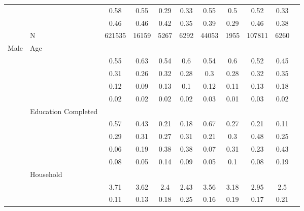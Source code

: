 \begin{table}[ht]
\begin{tabular}{l>{\raggedright\arraybackslash}p{3.2cm}|ccccccccc}
   & \multicolumn{1}{>{\raggedleft\arraybackslash}p{2.9cm}|}{\makebox[2.9cm][r]{Lives with Child }} & 0.58 & 0.55 & 0.29 & 0.33 & 0.55 & 0.5 & 0.52 & 0.33 \\ 
   & \multicolumn{1}{>{\raggedleft\arraybackslash}p{3.4cm}|}{\makebox[3.4cm][r]{Married/Cohabiting }} & 0.46 & 0.46 & 0.42 & 0.35 & 0.39 & 0.29 & 0.46 & 0.38 \\ 
   & N & 621535 & 16159 & 5267 & 6292 & 44053 & 1955 & 107811 & 6260 \\ 
  Male & Age &  &  &  &  &  &  &  &  \\ 
   & \multicolumn{1}{>{\raggedleft\arraybackslash}p{1.5cm}|}{\makebox[1.5cm][r]{60 - 69 }} & 0.55 & 0.63 & 0.54 & 0.6 & 0.54 & 0.6 & 0.52 & 0.45 \\ 
   & \multicolumn{1}{>{\raggedleft\arraybackslash}p{1.5cm}|}{\makebox[1.5cm][r]{70 - 79 }} & 0.31 & 0.26 & 0.32 & 0.28 & 0.3 & 0.28 & 0.32 & 0.35 \\ 
   & \multicolumn{1}{>{\raggedleft\arraybackslash}p{1.5cm}|}{\makebox[1.5cm][r]{80 - 89 }} & 0.12 & 0.09 & 0.13 & 0.1 & 0.12 & 0.11 & 0.13 & 0.18 \\ 
   & \multicolumn{1}{>{\raggedleft\arraybackslash}p{1.5cm}|}{\makebox[1.5cm][r]{90 plus }} & 0.02 & 0.02 & 0.02 & 0.02 & 0.03 & 0.01 & 0.03 & 0.02 \\ 
   & Education Completed &  &  &  &  &  &  &  &  \\ 
   & \multicolumn{1}{>{\raggedleft\arraybackslash}p{3.2cm}|}{\makebox[3.2cm][r]{Less than Primary }} & 0.57 & 0.43 & 0.21 & 0.18 & 0.67 & 0.27 & 0.21 & 0.11 \\ 
   & \multicolumn{1}{>{\raggedleft\arraybackslash}p{1.7cm}|}{\makebox[1.7cm][r]{Primary }} & 0.29 & 0.31 & 0.27 & 0.31 & 0.21 & 0.3 & 0.48 & 0.25 \\ 
   & \multicolumn{1}{>{\raggedleft\arraybackslash}p{2cm}|}{\makebox[2cm][r]{Secondary }} & 0.06 & 0.19 & 0.38 & 0.38 & 0.07 & 0.31 & 0.23 & 0.43 \\ 
   & \multicolumn{1}{>{\raggedleft\arraybackslash}p{2cm}|}{\makebox[2cm][r]{University }} & 0.08 & 0.05 & 0.14 & 0.09 & 0.05 & 0.1 & 0.08 & 0.19 \\ 
   & Household &  &  &  &  &  &  &  &  \\ 
   & \multicolumn{1}{>{\raggedleft\arraybackslash}p{2.7cm}|}{\makebox[2.7cm][r]{Household Size }} & 3.71 & 3.62 & 2.4 & 2.43 & 3.56 & 3.18 & 2.95 & 2.5 \\ 
   & \multicolumn{1}{>{\raggedleft\arraybackslash}p{2.2cm}|}{\makebox[2.2cm][r]{Lives Alone }} & 0.11 & 0.13 & 0.18 & 0.25 & 0.16 & 0.19 & 0.17 & 0.21 \\ 

\end{tabular}
\end{table}
